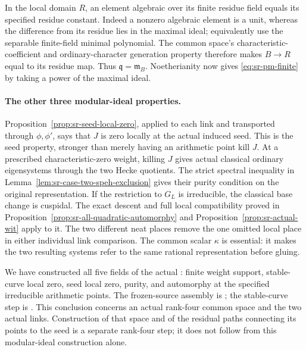 In the local domain \(R\), an element algebraic over its
finite residue field equals its specified residue constant.
Indeed a nonzero algebraic element is a unit, whereas the
difference from its residue lies in the maximal ideal;
equivalently use the separable finite-field minimal polynomial.
The common space's characteristic-coefficient and
ordinary-character generation property therefore makes
\(B\to R\) equal to its residue map.
Thus \(\mathfrak q=\mathfrak m_B\).
Noetherianity now gives \eqref{eq:sr-pm-finite} by taking a
power of the maximal ideal.

\paragraph{The other three modular-ideal properties.}
Proposition~\ref{prop:sr-seed-local-zero}, applied to each
link and transported through \(\phi,\phi'\), says that \(J\)
is zero locally at the actual induced seed.
This is the seed property, stronger than merely having an
arithmetic point kill \(J\).
At a prescribed characteristic-zero weight, killing \(J\)
gives actual classical ordinary eigensystems through the two
Hecke quotients.
The strict spectral inequality in
Lemma~\ref{lem:sr-case-two-speh-exclusion} gives their purity
condition on the original representation.
If the restriction to \(G_L\) is irreducible, the classical
base change is cuspidal.
The exact descent and full local compatibility proved in
Proposition~\ref{prop:sr-all-quadratic-automorphy} and
Proposition~\ref{prop:sr-actual-wit} apply to it.
The two different neat places remove the one omitted local
place in either individual link comparison.
The common scalar \(\kappa\) is essential: it makes the
two resulting systems refer to the same rational
representation before gluing.

We have constructed all five fields of the actual
: finite weight support,
stable-curve local zero, seed local zero, purity, and
automorphy at the specified irreducible arithmetic points.
The frozen-source assembly is ; the stable-curve
step is .
This conclusion concerns an actual rank-four common space and
the two actual links. Construction of that space and of the
residual paths connecting its points to the seed is a separate
rank-four step; it does not follow from this modular-ideal
construction alone.
